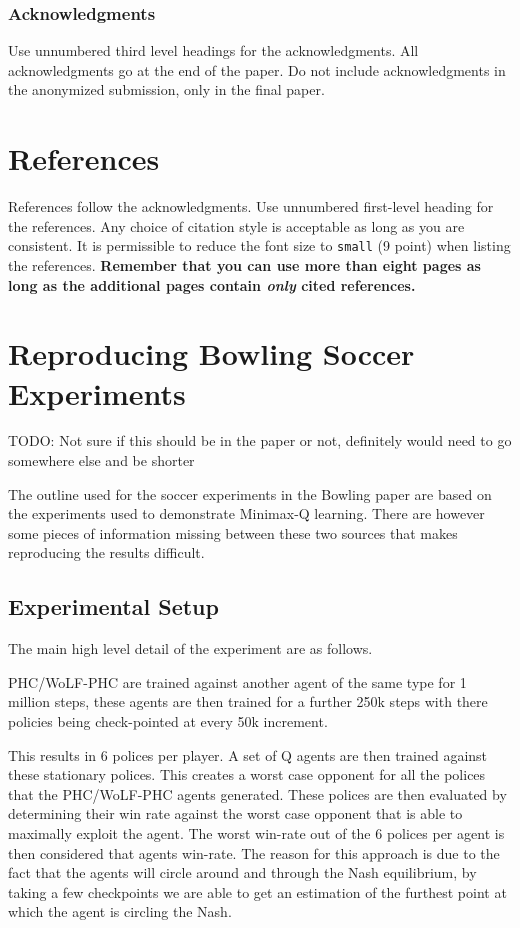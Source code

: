 \documentclass{article}
\newcommand\TODO[1]{{\color{red}TODO: #1}}
\begin{document}
\subsubsection*{Acknowledgments}

Use unnumbered third level headings for the acknowledgments. All acknowledgments
go at the end of the paper. Do not include acknowledgments in the anonymized
submission, only in the final paper.

\section*{References}

References follow the acknowledgments. Use unnumbered first-level heading for
the references. Any choice of citation style is acceptable as long as you are
consistent. It is permissible to reduce the font size to \verb+small+ (9 point)
when listing the references. {\bf Remember that you can use more than eight
  pages as long as the additional pages contain \emph{only} cited references.}
  
\section*{Reproducing Bowling Soccer Experiments}

\TODO{Not sure if this should be in the paper or not, definitely would need to go somewhere else and be shorter}

The outline used for the soccer experiments in the Bowling paper are based on the experiments used to demonstrate Minimax-Q learning. There are however some pieces of information missing between these two sources that makes reproducing the results difficult. 

\subsection*{Experimental Setup}

The main high level detail of the experiment are as follows.

PHC/WoLF-PHC are trained against another agent of the same type for 1 million steps, these agents are then trained for a further 250k steps with there policies being check-pointed at every 50k increment.

This results in 6 polices per player. A set of Q agents are then trained against these stationary polices. This creates a worst case opponent for all the polices that the PHC/WoLF-PHC agents generated. These polices are then evaluated by determining their win rate against the worst case opponent that is able to maximally exploit the agent. The worst win-rate out of the 6 polices per agent is then considered that agents win-rate. The reason for this approach is due to the fact that the agents will circle around and through the Nash equilibrium, by taking a few checkpoints we are able to get an estimation of the furthest point at which the agent is circling the Nash. 
\end{document}
